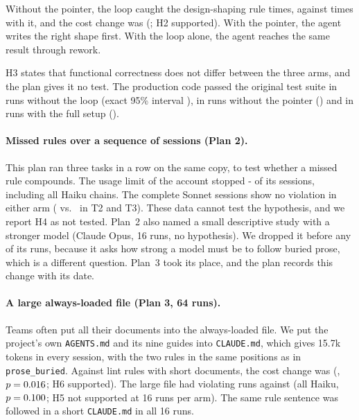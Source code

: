\documentclass[pdflatex,sn-mathphys-num]{sn-jnl}
\newcommand{\file}[1]{\texttt{#1}}
\newcommand{\arm}[1]{\texttt{#1}}
\begin{document}
Without the pointer, the loop caught the design-shaping rule \HTwoCatchNoPointer{} times, against \HOneCatchFull{} times with it, and the cost change was \HTwoCost{} (\HTwoCI; H2 supported).
With the pointer, the agent writes the right shape first.
With the loop alone, the agent reaches the same result through rework.

H3 states that functional correctness does not differ between the three arms, and the plan gives it no test.
The production code passed the original test suite in \HThreeNoLoop{} runs without the loop (exact 95\% interval \HThreeNoLoopCI), in \HThreeNoPointer{} runs without the pointer (\HThreeNoPointerCI) and in \HThreeFull{} runs with the full setup (\HThreeFullCI).

\paragraph{Missed rules over a sequence of sessions (Plan 2).}
This plan ran three tasks in a row on the same copy, to test whether a missed rule compounds.
The usage limit of the account stopped \the\numexpr\SeqPlanned-\SeqOk\relax{} of its \SeqPlanned{} sessions, including all Haiku chains.
The complete Sonnet sessions show no violation in either arm (\HFourBreaks{} vs.\ \HFourBreaksAgainst{} in T2 and T3).
These data cannot test the hypothesis, and we report H4 as not tested.
Plan~2 also named a small descriptive study with a stronger model (Claude Opus, 16 runs, no hypothesis).
We dropped it before any of its runs, because it asks how strong a model must be to follow buried prose, which is a different question.
Plan~3 took its place, and the plan records this change with its date.

\paragraph{A large always-loaded file (Plan 3, 64 runs).}
Teams often put all their documents into the always-loaded file.
We put the project's own \file{AGENTS.md} and its nine guides into \file{CLAUDE.md}, which gives 15.7k tokens in every session, with the two rules in the same positions as in \arm{prose\_buried}.
Against lint rules with short documents, the cost change was \HSixCost{} (\HSixCI, $p=0.016$; H6 supported).
The large file had \HFiveBreaks{} violating runs against \HFiveBreaksAgainst{} (all Haiku, $p=0.100$; H5 not supported at 16 runs per arm).
The same rule sentence was followed in a short \file{CLAUDE.md} in all 16 runs.
\end{document}
